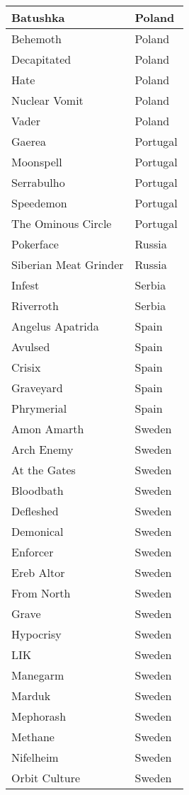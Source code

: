 \documentclass[12pt, a4paper, twoside]{report}
\begin{document}
\begin{center}
\begin{longtable}{|p{5cm}|p{5cm}|}
Batushka & Poland \\ \hline
Behemoth & Poland \\ \hline
Decapitated & Poland \\ \hline
Hate & Poland \\ \hline
Nuclear Vomit & Poland \\ \hline
Vader & Poland \\ \hline
Gaerea & Portugal \\ \hline
Moonspell & Portugal \\ \hline
Serrabulho & Portugal \\ \hline
Speedemon & Portugal \\ \hline
The Ominous Circle & Portugal \\ \hline
Pokerface & Russia \\ \hline
Siberian Meat Grinder & Russia \\ \hline
Infest & Serbia \\ \hline
Riverroth & Serbia \\ \hline
Angelus Apatrida & Spain \\ \hline
Avulsed & Spain \\ \hline
Crisix & Spain \\ \hline
Graveyard & Spain \\ \hline
Phrymerial & Spain \\ \hline
Amon Amarth & Sweden \\ \hline
Arch Enemy & Sweden \\ \hline
At the Gates & Sweden \\ \hline
Bloodbath & Sweden \\ \hline
Defleshed & Sweden \\ \hline
Demonical & Sweden \\ \hline
Enforcer & Sweden \\ \hline
Ereb Altor & Sweden \\ \hline
From North & Sweden \\ \hline
Grave & Sweden \\ \hline
Hypocrisy & Sweden \\ \hline
LIK & Sweden \\ \hline
Manegarm & Sweden \\ \hline
Marduk & Sweden \\ \hline
Mephorash & Sweden \\ \hline
Methane & Sweden \\ \hline
Nifelheim & Sweden \\ \hline
Orbit Culture & Sweden \\ \hline

\end{longtable}
\end{center}
\end{document}
